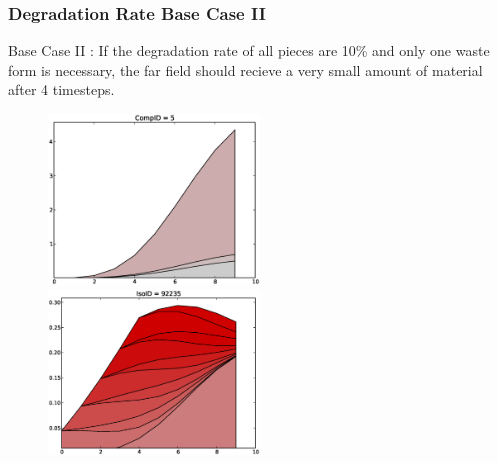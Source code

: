 \begin{frame}
  \frametitle{Degradation Rate Base Case II}
  Base Case II : If the degradation rate of all pieces are 10\% and only one 
  waste form is necessary, the far field should recieve a very small amount
  of material after 4 timesteps.

  \begin{figure}[htbp!]
    \begin{center}
      \includegraphics[width=0.5\textwidth]{cyder/images/deg_comp5.eps}
      \includegraphics[width=0.5\textwidth]{cyder/images/deg.eps}
    \end{center}
  \end{figure}
\end{frame}

